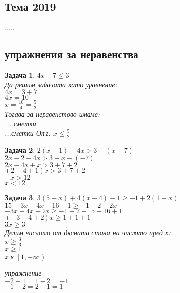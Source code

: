 \documentclass{article}
\theoremstyle{plain}
\newtheorem{problem}{Задача}
\begin{document}
\subsection{Тема 2019}
.....



\subsection{упражнения за неравенства}

\begin{problem}
	$4x - 7 \leq 3 $\\
	
	Да решим задачата като уравнение:\\	
	$4x = 3 +7 $ \\
	$4x = 10 $ \\
	$x = \frac{10}{4} = \frac{5}{2} $\\
	
	Тогава за неравенстово имаме:\\
	... сметки\\
	...сметки
	Отг. $x\leq \frac{5}{2} $
	
\end{problem}

\begin{problem}
	$2(x-1) -4x > 3 - (x-7)$\\
	$2x - 2 - 4x > 3 -x -(-7) $\\
	$ 2x - 4x +x > 3 +7 +2 $\\
	$(2-4+1)x > 3+7+2$\\
	$ -x > 12$\\
	$ x < 12 $
	
\end{problem}

\begin{problem}
	$3(5-x) + 4(x-4) - 1 \geq -1 + 2(1-x)$\\
	$15 -3x + 4x - 16 -1 \geq -1 +2 - 2x  $\\
	$-3x +4x +2x \geq -1 + 2 - 15 +16 + 1 $\\
	$(-3+4+2)x \geq 1 +1 + 1 $\\
	$ 3x \geq 3  $\\
	Делим числото от дясната стана на числото пред х:\\	
	$ x \geq \frac{3}{3} $\\
	$x \geq 1 $\\
	x  в $\left[ 1, +\infty \right) $
	
	
	
упражнение\\
$-2+1 = 1-2 = -1 $\\
$-1 +2 =2 -1 = 1 $\\

	
	
	
\end{problem}
\end{document}
